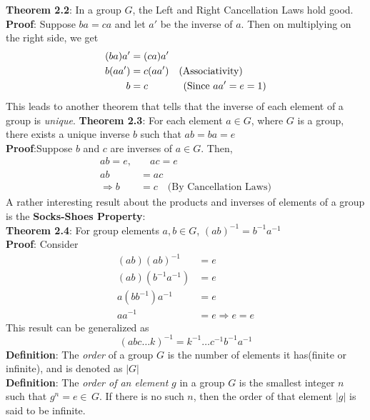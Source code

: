 \documentclass[a4paper, 12pt]{article}
\numberwithin{equation}{section}
\begin{document}
\noindent
\textbf{Theorem 2.2}: In a group $G$, the Left and Right Cancellation Laws hold good.\\
\textbf{Proof}: Suppose $ba = ca$ and let $a'$ be the inverse of $a$. Then on multiplying on the right side, we get
\begin{align*}
(ba)a' &= (ca)a'\\
b(aa') &= c(aa') \quad \text{(Associativity)}\\
b &= c \hspace{1.25cm} \text{(Since $aa' = e = 1$)}
\end{align*}
This leads to another theorem that tells that the inverse of each element of a group is \textit{unique}.
\newpage
\textbf{Theorem 2.3}: For each element $a \in G$, where $G$ is a group, there exists a unique inverse $b$ such that $ab = ba = e$\\
\textbf{Proof}:Suppose $b$ and $c$ are inverses of $a \in G$. Then, 
\begin{align*}
ab = e, &\quad ac = e\\
ab &= ac\\
\Rightarrow b &= c \quad \text{(By Cancellation Laws)}
\end{align*}
A rather interesting result about the products and inverses of elements of a group is the \textbf{Socks-Shoes Property}:\\
\textbf{Theorem 2.4}: For group elements $a,b \in G$, $(ab)^{-1} = b^{-1}a^{-1}$\\
\textbf{Proof}: Consider
\begin{align*}
(ab)(ab)^{-1} &= e\\
(ab)(b^{-1}a^{-1}) &= e\\
a(b b^{-1})a^{-1} &= e\\
aa^{-1} &= e \Rightarrow e = e
\end{align*}
This result can be generalized as
\begin{equation}
(abc\ldots k)^{-1} = k^{-1} \ldots c^{-1}b^{-1} a^{-1}
\end{equation}
\textbf{Definition}: The \textit{order} of a group $G$ is the number of elements it has(finite or infinite), and is denoted as $|G|$\\
\textbf{Definition}: The \textit{order of an element} $g$ in a group $G$ is the smallest integer $n$ such that $g^n = e \in \,G$. If there is no such $n$, then the order of that element $|g|$ is said to be infinite. 
\end{document}
